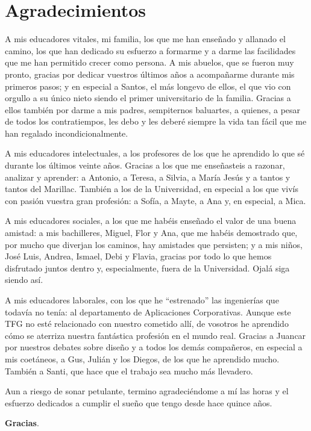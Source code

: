 \chapter*{Agradecimientos}

A mis educadores vitales, mi familia, los que me han enseñado y allanado el camino, los que han dedicado su esfuerzo a formarme y a darme las facilidades que me han permitido crecer como persona. A mis abuelos, que se fueron muy pronto, gracias por dedicar vuestros últimos años a acompañarme durante mis primeros pasos; y en especial a Santos, el más longevo de ellos, el que vio con orgullo a su único nieto siendo el primer universitario de la familia. Gracias a ellos también por darme a mis padres, sempiternos baluartes, a quienes, a pesar de todos los contratiempos, les debo y les deberé siempre la vida tan fácil que me han regalado incondicionalmente.

A mis educadores intelectuales, a los profesores de los que he aprendido lo que sé durante los últimos veinte años. Gracias a los que me enseñasteis a razonar, analizar y aprender: a Antonio, a Teresa, a Silvia, a María Jesús y a tantos y tantos del Marillac. También a los de la Universidad, en especial a los que vivís con pasión vuestra gran profesión: a Sofía, a Mayte, a Ana y, en especial, a Mica.

A mis educadores sociales, a los que me habéis enseñado el valor de una buena amistad: a mis bachilleres, Miguel, Flor y Ana, que me habéis demostrado que, por mucho que diverjan los caminos, hay amistades que persisten; y a mis niños, José Luis, Andrea, Ismael, Debi y Flavia, gracias por todo lo que hemos disfrutado juntos dentro y, especialmente, fuera de la Universidad. Ojalá siga siendo así.

A mis educadores laborales, con los que he ``estrenado'' las ingenierías que todavía no tenía: al departamento de Aplicaciones Corporativas. Aunque este TFG no esté relacionado con nuestro cometido allí, de vosotros he aprendido cómo se aterriza nuestra fantástica profesión en el mundo real. Gracias a Juancar por nuestros debates sobre diseño y a todos los demás compañeros, en especial a mis coetáneos, a Gus, Julián y los Diegos, de los que he aprendido mucho. También a Santi, que hace que el trabajo sea mucho más llevadero.

Aun a riesgo de sonar petulante, termino agradeciéndome a mí las horas y el esfuerzo dedicados a cumplir el sueño que tengo desde hace quince años.

\begin{center}
    \textbf{Gracias}.
\end{center}